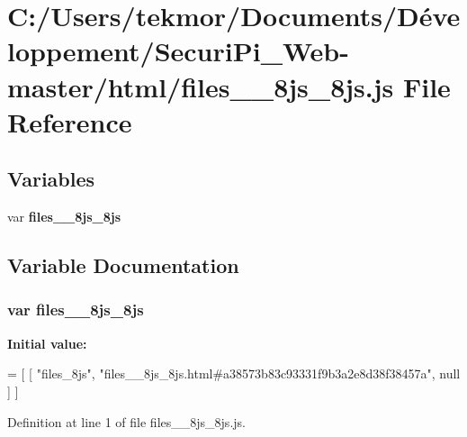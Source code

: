 \section{C\+:/\+Users/tekmor/\+Documents/\+Développement/\+Securi\+Pi\+\_\+\+Web-\/master/html/files\+\_\+\+\_\+8js\+\_\+8js.js File Reference}
\label{files____8js__8js_8js}
\subsection*{Variables}
\begin{DoxyCompactItemize}
\item 
var {\bf files\+\_\+\+\_\+8js\+\_\+8js}
\end{DoxyCompactItemize}


\subsection{Variable Documentation}
\subsubsection[{files\+\_\+\+\_\+8js\+\_\+8js}]{\setlength{\rightskip}{0pt plus 5cm}var files\+\_\+\+\_\+8js\+\_\+8js}\label{files____8js__8js_8js_a93907766922c2aaac479f080360f5d25}
{\bfseries Initial value\+:}
\begin{DoxyCode}
=
[
    [ \textcolor{stringliteral}{"files\_8js"}, \textcolor{stringliteral}{"files\_\_8js\_8js.html#a38573b83c93331f9b3a2e8d38f38457a"}, null ]
]
\end{DoxyCode}


Definition at line 1 of file files\+\_\+\+\_\+8js\+\_\+8js.\+js.

